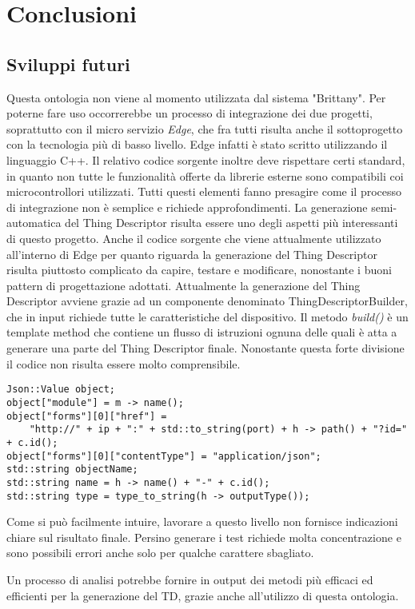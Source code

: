 \section{Conclusioni}
\subsection{Sviluppi futuri}
Questa ontologia non viene al momento utilizzata dal sistema "Brittany". Per poterne fare uso occorrerebbe un processo di integrazione dei due progetti, soprattutto con il micro servizio \textit{Edge}, che fra tutti risulta anche il sottoprogetto con la tecnologia più di basso livello. Edge infatti è stato scritto utilizzando il linguaggio C++. Il relativo codice sorgente inoltre deve rispettare certi standard, in quanto non tutte le funzionalità offerte da librerie esterne sono compatibili coi microcontrollori utilizzati. Tutti questi elementi fanno presagire come il processo di integrazione non è semplice e richiede approfondimenti.\newline\newline
\noindent La generazione semi-automatica del Thing Descriptor risulta essere uno degli aspetti più interessanti di questo progetto. Anche il codice sorgente che viene attualmente utilizzato all'interno di Edge per quanto riguarda la generazione del Thing Descriptor risulta piuttosto complicato da capire, testare e modificare, nonostante i buoni pattern di progettazione adottati.\newline
Attualmente la generazione del Thing Descriptor avviene grazie ad un componente denominato ThingDescriptorBuilder, che in input richiede tutte le caratteristiche del dispositivo. Il metodo \textit{build()} è un template method che contiene un flusso di istruzioni ognuna delle quali è atta a generare una parte del Thing Descriptor finale. Nonostante questa forte divisione il codice non risulta essere molto comprensibile.
\begin{info}[Esempio]
	\begin{verbatim}
Json::Value object;
object["module"] = m -> name();
object["forms"][0]["href"] =
	"http://" + ip + ":" + std::to_string(port) + h -> path() + "?id=" + c.id();
object["forms"][0]["contentType"] = "application/json";
std::string objectName;
std::string name = h -> name() + "-" + c.id();
std::string type = type_to_string(h -> outputType());
	\end{verbatim}

\noindent Come si può facilmente intuire, lavorare a questo livello non fornisce indicazioni chiare sul risultato finale. Persino generare i test richiede molta concentrazione e sono possibili errori anche solo per qualche carattere sbagliato.
\end{info}

\noindent Un processo di analisi potrebbe fornire in output dei metodi più efficaci ed efficienti per la generazione del TD, grazie anche all'utilizzo di questa ontologia.\newline
